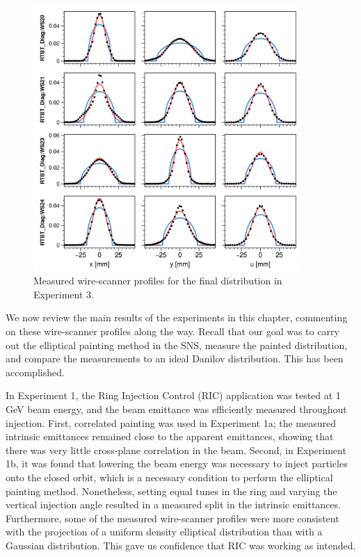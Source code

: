 %
\begin{figure}[!p]
    \centering
    \includegraphics[width=0.9\textwidth]{Images/chapter5/exp3/fits_7.png}
    \caption{Measured wire-scanner profiles for the final distribution in Experiment 3.}
    \label{fig:exp3_fits}
\end{figure}
%

We now review the main results of the experiments in this chapter, commenting on these wire-scanner profiles along the way. Recall that our goal was to carry out the elliptical painting method in the SNS, measure the painted distribution, and compare the measurements to an ideal Danilov distribution. This has been accomplished. 

In Experiment 1, the Ring Injection Control (RIC) application was tested at 1 GeV beam energy, and the beam emittance was efficiently measured throughout injection. First, correlated painting was used in Experiment 1a; the measured intrinsic emittances remained close to the apparent emittances, showing that there was very little cross-plane correlation in the beam. Second, in Experiment 1b, it was found that lowering the beam energy was necessary to inject particles onto the closed orbit, which is a necessary condition to perform the elliptical painting method. Nonetheless, setting equal tunes in the ring and varying the vertical injection angle resulted in a measured split in the intrinsic emittances. Furthermore, some of the measured wire-scanner profiles were more consistent with the projection of a uniform density elliptical distribution than with a Gaussian distribution. This gave us confidence that RIC was working as intended.

